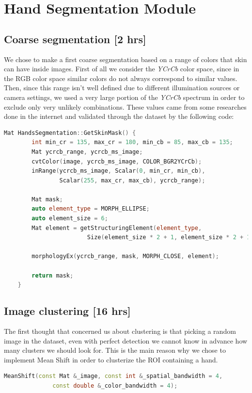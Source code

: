 \section{Hand Segmentation Module}

\subsection{Coarse segmentation [2 hrs]}
We chose to make a first coarse segmentation based on a range of colors that
skin can have inside images. First of all we consider the \textit{YCrCb} color
space, since in the RGB color space similar colors do not always correspond to
similar values. Then, since this range isn't well defined due to
different illumination sources or camera settings, we used a very large portion
of the \textit{YCrCb} spectrum in order to exclude only very unlikely
combinations. These values came from some researches done in the internet and
validated through the dataset by the following code:

\begin{lstlisting}[language = c++]
    Mat HandsSegmentation::GetSkinMask() {
        int min_cr = 135, max_cr = 180, min_cb = 85, max_cb = 135;
        Mat ycrcb_range, ycrcb_ms_image;
        cvtColor(image, ycrcb_ms_image, COLOR_BGR2YCrCb);
        inRange(ycrcb_ms_image, Scalar(0, min_cr, min_cb), 
                Scalar(255, max_cr, max_cb), ycrcb_range);
    
        Mat mask;
        auto element_type = MORPH_ELLIPSE;
        auto element_size = 6;
        Mat element = getStructuringElement(element_type, 
                        Size(element_size * 2 + 1, element_size * 2 + 1));

        morphologyEx(ycrcb_range, mask, MORPH_CLOSE, element);
    
        return mask;
    }
\end{lstlisting}

\subsection{Image clustering [16 hrs]}
The first thought that concerned us about clustering is that picking a random
image in the dataset, even with perfect detection we cannot know in advance how
many clusters we should look for.
This is the main reason why we chose to implement Mean Shift in order to
clusterize the ROI containing a hand.

\begin{lstlisting}[language = c++]
    MeanShift(const Mat &_image, const int &_spatial_bandwidth = 4, 
              const double &_color_bandwidth = 4);
    \end{lstlisting}

